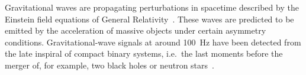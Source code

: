 Gravitational waves are propagating perturbations in spacetime described by the Einstein field equations of General Relativity~\cite{cai_2017,Maggiore:2007}. %
These waves are predicted to be emitted by the acceleration of massive objects under certain asymmetry conditions. %
Gravitational-wave signals at around 100~Hz have been detected from the late inspiral of compact binary systems, i.e.\ the last moments before the merger of, for example, two black holes or neutron stars~\cite{GWTC-1:2018}.
